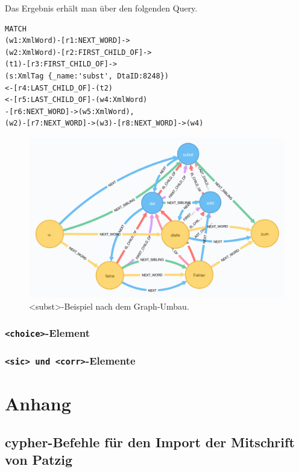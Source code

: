 \documentclass[ngerman,]{scrreprt}
\begin{document}
Das Ergebnis erhält man über den folgenden Query.

\begin{verbatim}
MATCH
(w1:XmlWord)-[r1:NEXT_WORD]->
(w2:XmlWord)-[r2:FIRST_CHILD_OF]->
(t1)-[r3:FIRST_CHILD_OF]->
(s:XmlTag {_name:'subst', DtaID:8248})
<-[r4:LAST_CHILD_OF]-(t2)
<-[r5:LAST_CHILD_OF]-(w4:XmlWord)
-[r6:NEXT_WORD]->(w5:XmlWord),
(w2)-[r7:NEXT_WORD]->(w3)-[r8:NEXT_WORD]->(w4)
\end{verbatim}

\begin{figure}
\centering
\includegraphics{Bilder/TEI2Graph/subst-add-del-bearbeitet.png}
\caption{\textless{}subst\textgreater{}-Beispiel nach dem Graph-Umbau.}
\end{figure}

\subsection{\texorpdfstring{\texttt{\textless{}choice\textgreater{}}-Element}{\textless{}choice\textgreater{}-Element}}\label{choice-element}

\subsection{\texorpdfstring{\texttt{\textless{}sic\textgreater{}\ und\ \textless{}corr\textgreater{}}-Elemente}{\textless{}sic\textgreater{} und \textless{}corr\textgreater{}-Elemente}}\label{sic-und-corr-elemente}

\chapter{Anhang}\label{anhang}

\section{cypher-Befehle für den Import der Mitschrift von Patzig}\label{cypher-befehle-fuxfcr-den-import-der-mitschrift-von-patzig}
\end{document}
